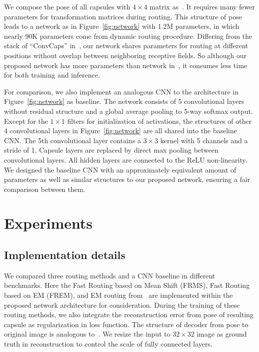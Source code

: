 \documentclass[runningheads]{llncs}
\begin{document}
We compose the pose of all capsules with $4\times{4}$ matrix as~\cite{hinton2018emrouting}. It requires many fewer parameters for transformation matrices during routing. This structure of pose leads to a network as in Figure~\ref{fig:network} with 1.2M parameters, in which nearly 90K parameters come from dynamic routing procedure. Differing from the stack of ``ConvCaps'' in~\cite{hinton2018emrouting}, our network shares parameters for routing at different positions without overlap between neighboring receptive fields. So although our proposed network has more parameters than network in~\cite{hinton2018emrouting}, it consumes less time for both training and inference.

For comparison, we also implement an analogous CNN to the architecture in Figure~\ref{fig:network} as baseline. The network consists of 5 convolutional layers without residual structure and a global average pooling to 5-way softmax output. Except for the $1\times{1}$ filters for initialization of activations, the structures of other 4 convolutional layers in Figure~\ref{fig:network} are all shared into the baseline CNN. The 5th convolutional layer contains a $3\times{3}$ kernel with 5 channels and a stride of 1. Capsule layers are replaced by direct max pooling between convolutional layers. All hidden layers are connected to the ReLU non-linearity. We designed the baseline CNN with an approximately equivalent amount of parameters as well as similar structures to our proposed network, ensuring a fair comparison between them.

\section{Experiments}
\subsection{Implementation details}
We compared three routing methods and a CNN baseline in different benchmarks. Here the Fast Routing based on Mean Shift (FRMS), Fast Routing based on EM (FREM), and EM routing from~\cite{hinton2018emrouting} are implemented within the proposed network architecture for consideration. During the training of these routing methods, we also integrate the reconstruction error from pose of resulting capsule as regularization in loss function. The structure of decoder from pose to original image is analogous to~\cite{sabour2017dynamic}. We resize the input to $32\times{32}$ image as ground truth in reconstruction to control the scale of fully connected layers.
\end{document}
